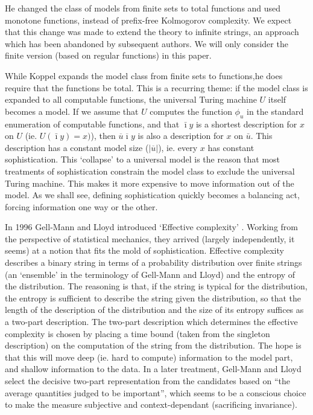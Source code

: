 \documentclass{style/llncs}
\newcommand{\br}[1]{\overline{#1}}
\begin{document}
He changed the class of models from finite sets to total functions and used monotone functions, instead of prefix-free Kolmogorov complexity. We expect that this change was made to extend the theory to infinite strings, an approach which has been abandoned by subsequent authors. We will only consider the finite version (based on regular functions) in this paper.

While Koppel expands the model class from finite sets to functions,he does require that the functions be total. This is a recurring theme: if the model class is expanded to all computable functions, the universal Turing machine $U$ itself becomes a model. If we assume that $U$ computes the function $\phi_u$ in the standard enumeration of computable functions, and that $\bar\imath y$ is a shortest description for $x$ on $U$ (ie. $U(\bar\imath y) = x)$), then $\br{u}\br{\imath}y$ is also a description for $x$ on $\bar u$. This description has a constant model size ($|\br{u}|$), ie. every $x$ has constant sophistication. This `collapse' to a universal model is the reason that most treatments of sophistication constrain the model class to exclude the universal Turing machine. This makes it more expensive to move information out of the model. As we shall see, defining sophistication quickly becomes a balancing act, forcing information one way or the other.

In 1996 Gell-Mann and Lloyd introduced `Effective complexity' \cite{gellmann1996information}. Working from the perspective of statistical mechanics, they arrived (largely independently, it seems) at a notion that fits the mold of sophistication. Effective complexity describes a binary string in terms of a probability distribution over finite strings (an `ensemble' in the terminology of Gell-Mann and Lloyd) and the entropy of the distribution. The reasoning is that, if the string is typical for the distribution, the entropy is sufficient to describe the string given the distribution, so that the length of the description of the distribution and the size of its entropy suffices as a two-part description. The two-part description which determines the effective complexity is chosen by placing a time bound (taken from the singleton description) on the computation of the string from the distribution. The hope is that this will move deep (ie. hard to compute) information to the model part, and shallow information to the data. In a later treatment\cite{gell2004nonextensive}, Gell-Mann and Lloyd select the decisive two-part representation from the candidates based on ``the average quantities judged to be important'', which seems to be a conscious choice to make the measure subjective and context-dependant (sacrificing invariance).
\end{document}
